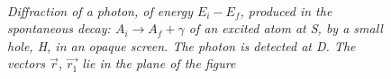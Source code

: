 {

 \begin{figure}[htbp]
\begin{center}
\hspace*{-0.5cm}\mbox{
}
\caption{{\sl Diffraction of a photon, of energy $E_i-E_f$, produced in the spontaneous 
  decay: $A_i \rightarrow A_f+ \gamma$ of an excited atom at S, by a small hole, H, in an opaque
  screen. The photon is detected at D. The vectors $\vec{r}$, $\vec{r_1}$ lie in the plane of the figure}} 
\label{fig-fig1}
\end{center}
\end{figure}

}

